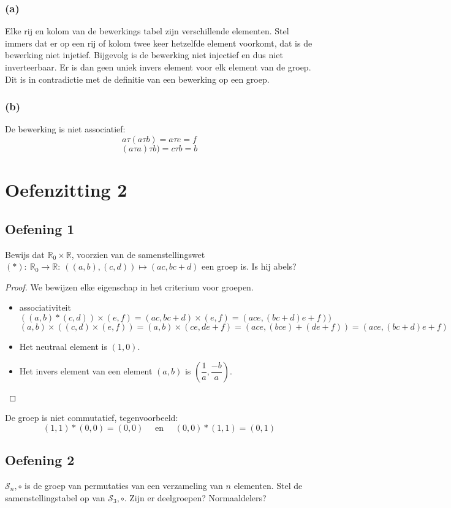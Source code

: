 \documentclass[main.tex]{subfiles}
\begin{document}
\subsubsection*{(a)}
Elke rij en kolom van de bewerkings tabel zijn verschillende elementen.
Stel immers dat er op een rij of kolom twee keer hetzelfde element voorkomt, dat is de bewerking niet injetief.
Bijgevolg is de bewerking niet injectief en dus niet inverteerbaar.
Er is dan geen uniek invers element voor elk element van de groep.
Dit is in contradictie met de definitie van een bewerking op een groep.

\subsubsection*{(b)}
De bewerking is niet associatief:
\[
a \tau (a \tau b)=a \tau e=f
\]
\[
(a \tau a) \tau b)=c \tau b=b
\]

\section{Oefenzitting 2}
\subsection*{Oefening 1}

Bewijs dat $\mathbb{R}_0 \times \mathbb{R}$, voorzien van de samenstellingswet $(*):\ \mathbb{R}_{0}\rightarrow \mathbb{R}:\ ((a,b),(c,d)) \mapsto (ac,bc+d)$ een groep is.
Is hij abels?
\begin{proof} 
We bewijzen elke eigenschap in het criterium voor groepen.
\begin{itemize}
  \item associativiteit
  \[
  ((a,b)*(c,d))\times (e,f)=(ac,bc+d)\times (e,f)=(ace,(bc+d)e+f))
  \]
  \[
  (a,b) \times ((c,d) \times (e,f))=(a,b) \times
  (ce,de+f)=(ace,(bce)+(de+f))=(ace,(bc+d)e+f)
  \]
  \item Het neutraal element is $(1,0)$. 
  \item Het invers element van een element $(a,b)$ is  $(\dfrac{1}{a},\dfrac{-b}{a})$.
\end{itemize}
\end{proof}
De groep is niet commutatief, tegenvoorbeeld:
\[
(1,1)*(0,0) = (0,0) \quad\text{ en }\quad (0,0)*(1,1) = (0,1)
\]

\subsection*{Oefening 2}
$\mathcal{S}_{n},\circ$ is de groep van permutaties van een verzameling van $n$ elementen.
Stel de samenstellingstabel op van $\mathcal{S}_{3},\circ$.
Zijn er deelgroepen?
Normaaldelers? 
\end{document}
